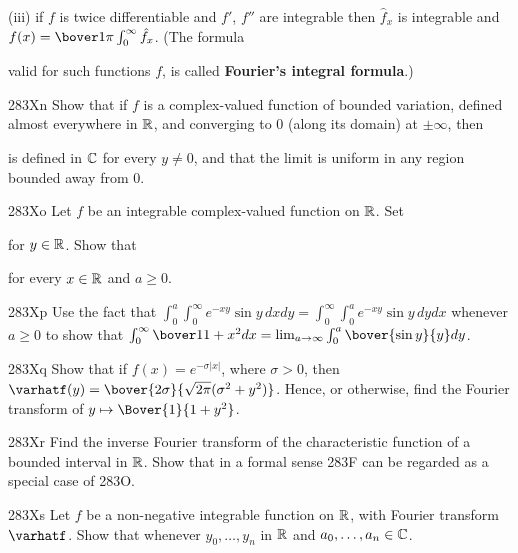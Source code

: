 {\quad (iii) if $f$ is twice differentiable and $f'$, $f''$ are
integrable then $\hat f_x$ is integrable and
$f(x)=\bover1{\pi}\int_0^{\infty}\hat f_x$.
(The formula


\noindent valid for such functions $f$, is called {\bf Fourier's
integral formula}.)

\spheader 283Xn Show that if $f$ is a complex-valued function of
bounded variation, defined almost everywhere in $\Bbb R$, and converging
to $0$ (along its domain) at $\pm\infty$, then


\noindent is defined in $\Bbb C$ for every $y\ne 0$, and that the limit
is uniform in any region bounded away from $0$.

\spheader 283Xo Let $f$ be an integrable complex-valued function
on $\Bbb R$.   Set


\noindent for $y\in\Bbb R$.   Show that


\noindent for every $x\in\Bbb R$ and $a\ge 0$.

\spheader 283Xp Use the fact that
$\int_{0}^a\int_{0}^{\infty}e^{-xy}\sin
y\,dxdy=\int_{0}^{\infty}\int_{0}^ae^{-xy}\sin y\,dydx$ whenever
$a\ge 0$ to show that 
$\int_0^{\infty}\bover1{1+x^2}dx=\lim_{a\to\infty}\int_0^a\bover{\sin y}{y}dy$.

\sqheader 283Xq Show that if $f(x)=e^{-\sigma|x|}$, where
$\sigma>0$, then
$\varhatf(y)=\bover{2\sigma}{\sqrt{2\pi}(\sigma^2+y^2)}$.
Hence, or otherwise, find the Fourier transform of
$y\mapsto\Bover{1}{1+y^2}$.

\spheader 283Xr Find the inverse Fourier transform of the
characteristic function of a bounded interval in $\Bbb R$.   Show that
in a formal sense 283F can be regarded as a special case of 283O.

\spheader 283Xs Let $f$ be a non-negative integrable function on
$\Bbb R$, with Fourier transform $\varhatf$.   Show that
whenever $y_0,\ldots,y_n$ in
$\Bbb R$ and $a_0,\ldots,a_n\in\Bbb C$.

}
